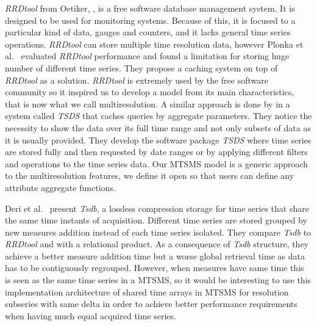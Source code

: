\emph{RRDtool} from Oetiker, \cite{rrdtool,lisa98:oetiker}, is a free
software database management system. It is designed to be used for
monitoring systems. Because of this, it is focused to a particular
kind of data, gauges and counters, and it lacks general time series
operations. \emph{RRDtool} can store multiple time resolution data,
however Plonka et al.\ \cite{lisa07:plonka} evaluated \emph{RRDtool}
performance and found a limitation for storing huge number of
different time series. They propose a caching system on top of
\emph{RRDtool} as a solution.  \emph{RRDtool} is extremely used by the
free software community so it inspired us to develop a model from its
main characteristics, that is now what we call multiresolution. A
similar approach is done by \cite{weigel10} in a system called
\emph{TSDS} that caches queries by aggregate parameters. They notice
the necessity to show the data over its full time range and not only
subsets of data as it is usually provided.  They develop the software
package \emph{TSDS} where time series are stored fully and then
requested by date ranges or by applying different filters and
operations to the time series data.  Our MTSMS model is a generic
approach to the multiresolution features, we define it open so that
users can define any attribute aggregate functions.


Deri et al.\ \cite{deri12:tsdb_compressed_database} present
\emph{Tsdb}, a lossless compression storage  for time
series that share the same time instants of acquisition. Different
time series are stored grouped by new measures addition instead of
each time series isolated.  They compare \emph{Tsdb} to \emph{RRDtool} and
with a relational product. As a consequence of \emph{Tsdb} structure,
they achieve a better measure addition time but a worse global
retrieval time as data has to be contiguously regrouped. However, when
measures have same time this is seen as the same time series in a
MTSMS, so it would be interesting to use this implementation
architecture of shared time arrays in MTSMS for resolution subseries
with same delta in order to achieve better performance requirements
when having much equal acquired time series.



